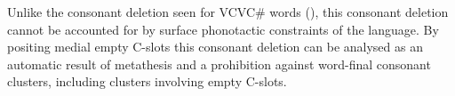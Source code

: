 Unlike the consonant deletion seen for VCVC{\#} words (),
this consonant deletion cannot be accounted for by surface phonotactic constraints of the language.
By positing medial empty C-slots this consonant deletion
can be analysed as an automatic result of metathesis
and a prohibition against word-final consonant clusters,
including clusters involving empty C-slots.
